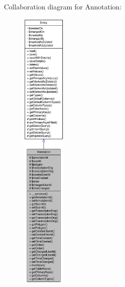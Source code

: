 Collaboration diagram for Annotation:\nopagebreak
\begin{figure}[H]
\begin{center}
\leavevmode
\includegraphics[height=400pt]{classAnnotation__coll__graph}
\end{center}
\end{figure}
